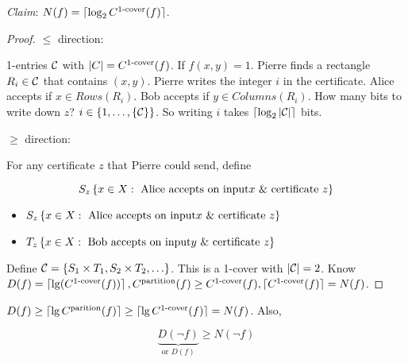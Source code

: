 \emph{Claim}: $N(f) = \left \lceil \log_2{C^{\text{1-cover}}(f)} \right \rceil$.

\begin{proof}
    $\leq$ direction:

    1-entries $\mathcal{C}$ with $\left | C \right | = C^{\text{1-cover}}(f)$. If $f(x, y) = 1$. Pierre finds a rectangle $R_i \in \mathcal{C}$ that contains $(x, y)$. Pierre writes the integer $i$ in the certificate. Alice accepts if $x \in Rows(R_i)$. Bob accepts if $y \in Columns(R_i)$. How many bits to write down $z$? $i \in \left \{ 1, \ldots, \left \{ \mathcal{C} \right \} \right \}$. So writing $i$ takes $\left \lceil \log_2{\left | \mathcal{C} \right |} \right \rceil$ bits.

    $\geq$ direction:

    For any certificate $z$ that Pierre could send, define

    \begin{equation*}
        S_z \left \{  x \in X: \text{ Alice accepts on input} x \text{ \& certificate } z \right \}
    \end{equation*}

    \begin{itemize}
        \item $S_z \left \{  x \in X: \text{ Alice accepts on input} x \text{ \& certificate } z \right \}$
        \item $T_z \left \{  x \in X: \text{ Bob accepts on input} y \text{ \& certificate } z \right \}$
    \end{itemize}

    Define $\mathcal{C} = \left \{ S_1 \times T_1, S_2 \times T_2, \ldots \right \}$. This is a 1-cover with $\left | \mathcal{C} \right | = 2$. Know $D(f) = \left \lceil \lg(C^{\text{1-cover}}(f)) \right \rceil, C^{\text{partition}}(f) \geq C^{\text{1-cover}}(f), \left \lceil C^{\text{1-cover}}(f) \right \rceil = N(f)$.
\end{proof}

\begin{corollary}
    $D(f) \geq \left \lceil \lg{C^{\text{parition}}}(f) \right \rceil \geq \left \lceil \lg{C^{\text{1-cover}}}(f) \right \rceil = N(f)$. Also,

    \begin{equation*}
        \underbrace{D(\neg f)}_{\text{or } D(f)} \geq N(\neg f)
    \end{equation*}
\end{corollary}
